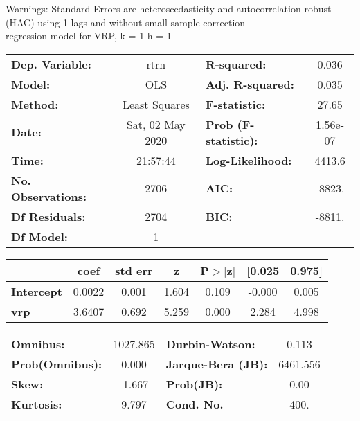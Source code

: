 Warnings: \newline
 [1] Standard Errors are heteroscedasticity and autocorrelation robust (HAC) using 1 lags and without small sample correction\\ 

regression model for VRP, k = 1 h = 1\begin{center}
\begin{tabular}{lclc}
\toprule
\textbf{Dep. Variable:}    &       rtrn       & \textbf{  R-squared:         } &     0.036   \\
\textbf{Model:}            &       OLS        & \textbf{  Adj. R-squared:    } &     0.035   \\
\textbf{Method:}           &  Least Squares   & \textbf{  F-statistic:       } &     27.65   \\
\textbf{Date:}             & Sat, 02 May 2020 & \textbf{  Prob (F-statistic):} &  1.56e-07   \\
\textbf{Time:}             &     21:57:44     & \textbf{  Log-Likelihood:    } &    4413.6   \\
\textbf{No. Observations:} &        2706      & \textbf{  AIC:               } &    -8823.   \\
\textbf{Df Residuals:}     &        2704      & \textbf{  BIC:               } &    -8811.   \\
\textbf{Df Model:}         &           1      & \textbf{                     } &             \\
\bottomrule
\end{tabular}
\begin{tabular}{lcccccc}
                   & \textbf{coef} & \textbf{std err} & \textbf{z} & \textbf{P$> |$z$|$} & \textbf{[0.025} & \textbf{0.975]}  \\
\midrule
\textbf{Intercept} &       0.0022  &        0.001     &     1.604  &         0.109        &       -0.000    &        0.005     \\
\textbf{vrp}       &       3.6407  &        0.692     &     5.259  &         0.000        &        2.284    &        4.998     \\
\bottomrule
\end{tabular}
\begin{tabular}{lclc}
\textbf{Omnibus:}       & 1027.865 & \textbf{  Durbin-Watson:     } &    0.113  \\
\textbf{Prob(Omnibus):} &   0.000  & \textbf{  Jarque-Bera (JB):  } & 6461.556  \\
\textbf{Skew:}          &  -1.667  & \textbf{  Prob(JB):          } &     0.00  \\
\textbf{Kurtosis:}      &   9.797  & \textbf{  Cond. No.          } &     400.  \\
\bottomrule
\end{tabular}
\end{center}


